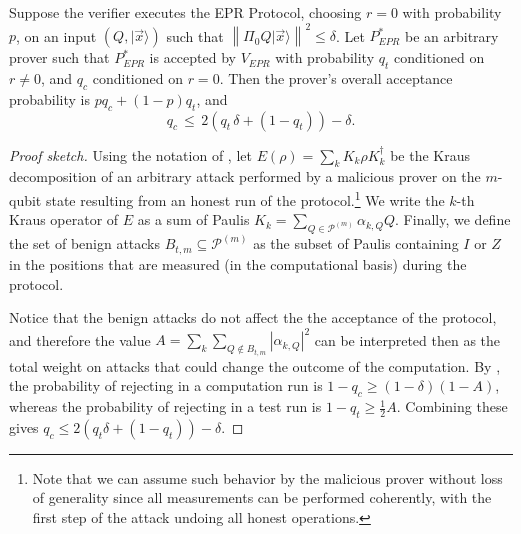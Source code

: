 \documentclass{toc}
\newcommand{\ket}[1]{|#1\rangle}
\newcommand{\norm}[1]{\left\|#1\right\|}
\newcommand{\paulin}{\mathcal{P}^{(m)}\!}
\begin{document}
\begin{theorem}[Soundness]\label{thm:EPR-soundness} 
Suppose the verifier executes the EPR Protocol, choosing $r=0$ with probability~$p$, on an input $(Q,\ket{\vec{x}})$ such that $\norm{\Pi_0 Q\ket{\vec{x}}}^2\leq \delta$. Let $P_{EPR}^*$ be an arbitrary prover such that $P_{EPR}^*$ is accepted by  $V_{EPR}$ with probability $q_t$ conditioned on $r\neq 0$, and $q_c$ conditioned on $r=0$. Then the prover's overall acceptance probability is $pq_c+(1-p)q_t$, and
$$q_c \,\leq\, 2\left(q_t\,\delta+(1-q_t)\right)-\delta.$$ 
\end{theorem}
\begin{proof}[Proof sketch]
Using the notation of \cite{broadbent15howtoverify}, let $E(\rho) = \sum_{k} K_k \rho K_k^\dagger$ be the Kraus decomposition of an arbitrary attack  performed by a malicious prover on the $m$-qubit state resulting from an honest run of the protocol.\footnote{Note that we can assume such behavior by the malicious prover without loss of generality since  all measurements can be performed coherently, with the first step of the attack undoing all honest operations.}  We write the $k$-th Kraus operator of $E$ as a sum of Paulis $K_k = \sum_{Q\in
  \paulin} \alpha_{k,Q} Q$. Finally, we define the set of benign attacks $B_{t,m} \subseteq \paulin$ as the subset of Paulis containing $I$ or $Z$ in the positions that are measured (in the computational basis) during the protocol.
  
  Notice that the benign attacks do not affect the the acceptance of the protocol, and therefore the value 
$A=\sum_k\sum_{Q 
\not\in
  B_{t,m}}|\alpha_{k,Q}|^2$ can be interpreted then as the total weight on attacks that could change the outcome of the computation. By \cite{broadbent15howtoverify}, the probability of rejecting in a computation run is $1-q_c\geq (1-\delta)(1-A)$, whereas the probability of rejecting in a test run is $1-q_t\geq \frac{1}{2}A$. Combining these gives $q_c\leq 2(q_t\delta+(1-q_t))-\delta$.
\end{proof}
\end{document}

